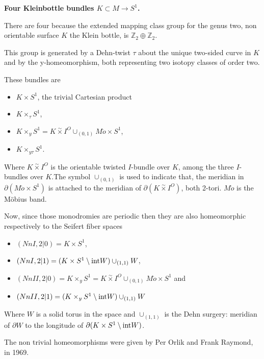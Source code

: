 \documentclass[12pt]{article}
\begin{document}
\centerline{\bf Four Kleinbottle bundles $K\subset M\to S^1$.}

There are four because the extended mapping class group  for the genus two, non orientable surface $K$ the Klein bottle, is ${\mathbb{Z}}_2\oplus{\mathbb{Z}}_2$.

This group is generated by a Dehn-twist $\tau$ about the unique two-sided curve in $K$  and by the y-homeomorphism, both representing two isotopy classes of order two. 

These bundles are\\

\begin{itemize}
\item $K\times S^1$, the trivial Cartesian product
\item $K\times_{\tau}S^1$,
\item $K\times_yS^1=K \stackrel{\sim}\times I^O \cup_{(0,1)} M\ddot{o}\times S^1 $, 

\item $K\times_{y\tau}S^1$.
\end{itemize}
 
Where $K\stackrel{\sim}\times I^O$ is the orientable twisted $I$-bundle over $K$, among the three $I$-bundles over $K$.The symbol 
$\cup_{(0,1)}$ is used to indicate that, the meridian in $\partial(M\ddot{o}\times S^1)$ is attached to the meridian of $\partial(K\stackrel{\sim}\times I ^O)$, both 2-tori. $M\ddot{o}$ is the M\"obius band.
 
Now, since those monodromies are periodic then they are also homeomorphic respectively to the Seifert fiber spaces
\begin{itemize}
\item $(NnI,2|0)=K\times S^1$,
\item $(NnI,2|1)=(K\times S^1\setminus{\rm int} W)\cup_{(1,1)}W$,
\item $(NnII,2|0)=K\times_yS^1=K \stackrel{\sim}\times I^O \cup_{(0,1)} M\ddot{o}\times S^1$ and
\item $(NnII,2|1)=(K\times_y S^1\setminus{\rm int} W)\cup_{(1,1)}W$
\end{itemize}

Where $W$ is a solid torus in the space and $\cup_{(1,1)}$ is the Dehn surgery: meridian of $\partial W$ to the longitude of $\partial(K\times S^1\setminus{\rm int} W)$.

The non trivial homeomorphisms were given by Per Orlik and Frank Raymond, in 1969.






\end{document}
